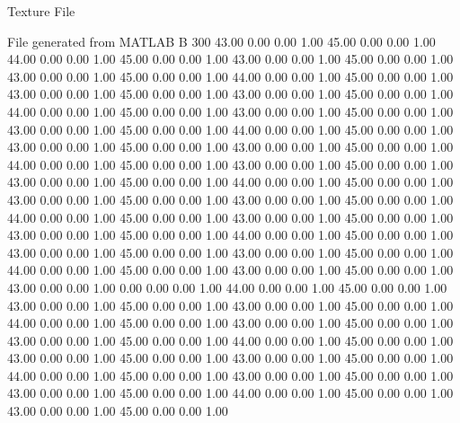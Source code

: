 Texture File

File generated from MATLAB
B 300
   43.00   0.00   0.00   1.00
   45.00   0.00   0.00   1.00
   44.00   0.00   0.00   1.00
   45.00   0.00   0.00   1.00
   43.00   0.00   0.00   1.00
   45.00   0.00   0.00   1.00
   43.00   0.00   0.00   1.00
   45.00   0.00   0.00   1.00
   44.00   0.00   0.00   1.00
   45.00   0.00   0.00   1.00
   43.00   0.00   0.00   1.00
   45.00   0.00   0.00   1.00
   43.00   0.00   0.00   1.00
   45.00   0.00   0.00   1.00
   44.00   0.00   0.00   1.00
   45.00   0.00   0.00   1.00
   43.00   0.00   0.00   1.00
   45.00   0.00   0.00   1.00
   43.00   0.00   0.00   1.00
   45.00   0.00   0.00   1.00
   44.00   0.00   0.00   1.00
   45.00   0.00   0.00   1.00
   43.00   0.00   0.00   1.00
   45.00   0.00   0.00   1.00
   43.00   0.00   0.00   1.00
   45.00   0.00   0.00   1.00
   44.00   0.00   0.00   1.00
   45.00   0.00   0.00   1.00
   43.00   0.00   0.00   1.00
   45.00   0.00   0.00   1.00
   43.00   0.00   0.00   1.00
   45.00   0.00   0.00   1.00
   44.00   0.00   0.00   1.00
   45.00   0.00   0.00   1.00
   43.00   0.00   0.00   1.00
   45.00   0.00   0.00   1.00
   43.00   0.00   0.00   1.00
   45.00   0.00   0.00   1.00
   44.00   0.00   0.00   1.00
   45.00   0.00   0.00   1.00
   43.00   0.00   0.00   1.00
   45.00   0.00   0.00   1.00
   43.00   0.00   0.00   1.00
   45.00   0.00   0.00   1.00
   44.00   0.00   0.00   1.00
   45.00   0.00   0.00   1.00
   43.00   0.00   0.00   1.00
   45.00   0.00   0.00   1.00
   43.00   0.00   0.00   1.00
   45.00   0.00   0.00   1.00
   44.00   0.00   0.00   1.00
   45.00   0.00   0.00   1.00
   43.00   0.00   0.00   1.00
   45.00   0.00   0.00   1.00
   43.00   0.00   0.00   1.00
   0.00   0.00   0.00   1.00
   44.00   0.00   0.00   1.00
   45.00   0.00   0.00   1.00
   43.00   0.00   0.00   1.00
   45.00   0.00   0.00   1.00
   43.00   0.00   0.00   1.00
   45.00   0.00   0.00   1.00
   44.00   0.00   0.00   1.00
   45.00   0.00   0.00   1.00
   43.00   0.00   0.00   1.00
   45.00   0.00   0.00   1.00
   43.00   0.00   0.00   1.00
   45.00   0.00   0.00   1.00
   44.00   0.00   0.00   1.00
   45.00   0.00   0.00   1.00
   43.00   0.00   0.00   1.00
   45.00   0.00   0.00   1.00
   43.00   0.00   0.00   1.00
   45.00   0.00   0.00   1.00
   44.00   0.00   0.00   1.00
   45.00   0.00   0.00   1.00
   43.00   0.00   0.00   1.00
   45.00   0.00   0.00   1.00
   43.00   0.00   0.00   1.00
   45.00   0.00   0.00   1.00
   44.00   0.00   0.00   1.00
   45.00   0.00   0.00   1.00
   43.00   0.00   0.00   1.00
   45.00   0.00   0.00   1.00
